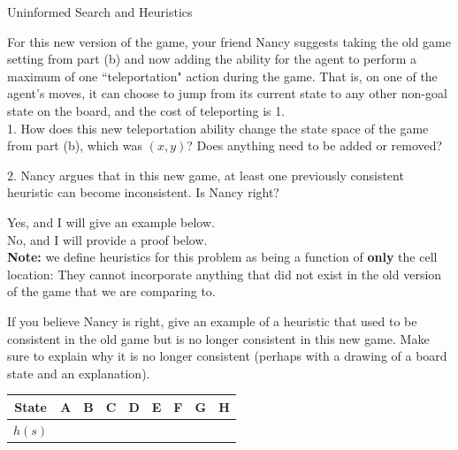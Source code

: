 \begin{problem}{Uninformed Search and Heuristics}
\begin{question}
\begin{subquestion}[8]For this new version of the game, your friend Nancy suggests taking the old game setting from part (b) and now adding the ability for the agent to perform a maximum of one ``teleportation" action during the game. That is, on one of the agent's moves, it can choose to jump from its current state to any other non-goal state on the board, and the cost of teleporting is 1. \\


1. How does this new teleportation ability change the state space of the game from part (b), which was $(x,y)$? Does anything need to be added or removed?



2. Nancy argues that in this new game, at least one previously consistent heuristic can become inconsistent. Is Nancy right?

\mcqs Yes, and I will give an example below.\\
\mcqb No, and I will provide a proof below.\\

\textbf{Note:} we define heuristics for this problem as being a function of \textbf{only} the cell location: They cannot incorporate anything that did not exist in the old version of the game that we are comparing to.

\vspace{0.5em}
\hrulefill
\vspace{0.5em}

If you believe Nancy is right, give an example of a heuristic that used to be consistent in the old game but is no longer consistent in this new game. Make sure to explain why it is no longer consistent (perhaps with a drawing of a board state and an explanation). 


\def\arraystretch{1.5}
\setlength\tabcolsep{15pt}
\begin{center}
\begin{tabular}{|c|c|c|c|c|c|c|c|c|}
     \hline
State & A & B & C & D & E & F & G & H  \\
     \hline
      $h(s)$ &  &  &  &  &  &  &  &  \\
     \hline
 \end{tabular}
 \end{center}





\vspace{0.5em}
\hrulefill
\vspace{0.5em}



\end{subquestion}
\end{question}
\end{problem}
